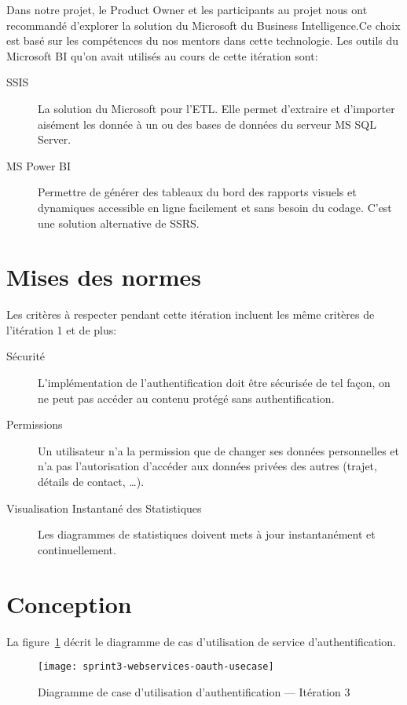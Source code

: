 Dans notre projet, le Product Owner et les participants au projet nous ont
recommandé d'explorer la solution du Microsoft du Business Intelligence.Ce
choix est basé sur les compétences du nos mentors dans cette technologie. Les
outils du Microsoft BI qu'on avait utilisés au cours de cette itération sont:

\begin{description}
    \item [\acrfull{SSIS}] La solution du Microsoft pour l'\acrshort{ETL}. Elle
        permet d'extraire et d'importer aisément les donnée à un ou des bases
        de données du serveur MS SQL Server.
    \item [MS Power BI] Permettre de générer des tableaux du bord des rapports
        visuels et dynamiques accessible en ligne facilement et sans besoin du
        codage. C'est une solution alternative de \acrfull{SSRS}.
\end{description}

\section{Mises des normes}

Les critères à respecter pendant cette itération incluent les même critères de
l'itération 1 et de plus:

\begin{description}
    \item [Sécurité] L'implémentation de l'authentification doit être sécurisée
        de tel façon, on ne peut pas accéder au contenu protégé sans
        authentification.
    \item [Permissions] Un utilisateur n'a la permission que de changer ses
        données personnelles et n'a pas l'autorisation d'accéder aux données
        privées des autres (trajet, détails de contact, \ldots).
    \item [Visualisation Instantané des Statistiques] Les diagrammes de
        statistiques doivent mets à jour instantanément et continuellement.
\end{description}

\section{Conception}

La figure~\ref{fig:sprint3-webservices-oauth-usecase} décrit le diagramme de
cas d'utilisation de service d'authentification.

\begin{figure}[H]
    \centering
    \texttt{[image: sprint3-webservices-oauth-usecase]}
    \caption{Diagramme de case d'utilisation d'authentification --- Itération 3}
\label{fig:sprint3-webservices-oauth-usecase}
\end{figure}

